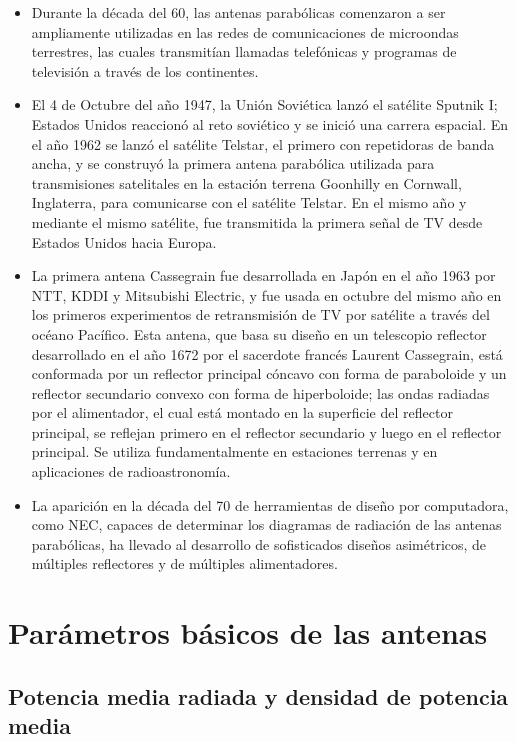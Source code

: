 \begin{itemize}
\item Durante la década del 60, las antenas parabólicas comenzaron a ser ampliamente utilizadas en las redes de comunicaciones de microondas terrestres, las cuales transmitían llamadas telefónicas y programas de televisión a través de los continentes.
\item El 4 de Octubre del año 1947, la Unión Soviética lanzó el satélite Sputnik I; Estados Unidos reaccionó al reto soviético y se inició una carrera espacial. En el año 1962 se lanzó el satélite Telstar, el primero con repetidoras de banda ancha, y se construyó la primera antena parabólica utilizada para transmisiones satelitales en la estación terrena Goonhilly en Cornwall, Inglaterra, para comunicarse con el satélite Telstar. En el mismo año y mediante el mismo satélite, fue transmitida la primera señal de TV desde Estados Unidos hacia Europa.
\item La primera antena Cassegrain fue desarrollada en Japón en el año 1963 por NTT, KDDI y Mitsubishi Electric, y fue usada en octubre del mismo año en los primeros experimentos de retransmisión de TV por satélite a través del océano Pacífico. Esta antena, que basa su diseño en un telescopio reflector desarrollado en el año 1672 por el sacerdote francés Laurent Cassegrain, está conformada por un reflector principal cóncavo con forma de paraboloide y un reflector secundario convexo con forma de hiperboloide; las ondas radiadas por el alimentador, el cual está montado en la superficie del reflector principal, se reflejan primero en el reflector secundario y luego en el reflector principal. Se utiliza fundamentalmente en estaciones terrenas y en aplicaciones de radioastronomía.
\item La aparición en la década del 70 de herramientas de diseño por computadora, como NEC, capaces de determinar los diagramas de radiación de las antenas parabólicas, ha llevado al desarrollo de sofisticados diseños asimétricos, de múltiples reflectores y de múltiples alimentadores.
\end{itemize}

\section{Parámetros básicos de las antenas}
\label{sec_intro_param_basicos}

\subsection{Potencia media radiada y densidad de potencia media}
\label{subsec_intro_pot_med_rad}


